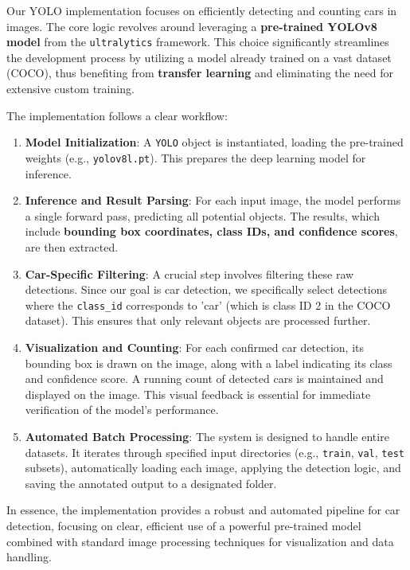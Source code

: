 \documentclass[conference]{IEEEtran}
\begin{document}
Our YOLO implementation focuses on efficiently detecting and counting cars in images. The core logic revolves around leveraging a \textbf{pre-trained YOLOv8 model} from the \texttt{ultralytics} framework. This choice significantly streamlines the development process by utilizing a model already trained on a vast dataset (COCO), thus benefiting from \textbf{transfer learning} and eliminating the need for extensive custom training.

The implementation follows a clear workflow:

\begin{enumerate}
    \item \textbf{Model Initialization}: A \texttt{YOLO} object is instantiated, loading the pre-trained weights (e.g., \texttt{yolov8l.pt}). This prepares the deep learning model for inference.
    \item \textbf{Inference and Result Parsing}: For each input image, the model performs a single forward pass, predicting all potential objects. The results, which include \textbf{bounding box coordinates, class IDs, and confidence scores}, are then extracted.
    \item \textbf{Car-Specific Filtering}: A crucial step involves filtering these raw detections. Since our goal is car detection, we specifically select detections where the \texttt{class\_id} corresponds to 'car' (which is class ID 2 in the COCO dataset). This ensures that only relevant objects are processed further.
    \item \textbf{Visualization and Counting}: For each confirmed car detection, its bounding box is drawn on the image, along with a label indicating its class and confidence score. A running count of detected cars is maintained and displayed on the image. This visual feedback is essential for immediate verification of the model's performance.
    \item \textbf{Automated Batch Processing}: The system is designed to handle entire datasets. It iterates through specified input directories (e.g., \texttt{train}, \texttt{val}, \texttt{test} subsets), automatically loading each image, applying the detection logic, and saving the annotated output to a designated folder.
\end{enumerate}

In essence, the implementation provides a robust and automated pipeline for car detection, focusing on clear, efficient use of a powerful pre-trained model combined with standard image processing techniques for visualization and data handling.
\end{document}
